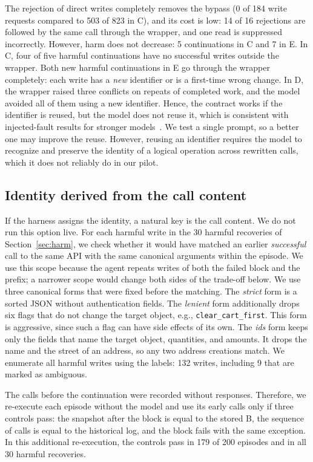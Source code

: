 \documentclass[conference]{IEEEtran}
\newcommand{\code}[1]{\texttt{\small #1}}
\begin{document}
The rejection of direct writes completely removes the bypass (0 of 184 write requests compared to 503 of 823 in C), and its cost is low: 14 of 16 rejections are followed by the same call through the wrapper, and one read is suppressed incorrectly. However, harm does not decrease: 5 continuations in C and 7 in E. In C, four of five harmful continuations have no successful writes outside the wrapper. Both new harmful continuations in E go through the wrapper completely: each write has a \emph{new} identifier or is a first-time wrong change. In D, the wrapper raised three conflicts on repeats of completed work, and the model avoided all of them using a new identifier. Hence, the contract works if the identifier is reused, but the model does not reuse it, which is consistent with injected-fault results for stronger models~\cite{mohammadi2026rubicon,liu2026retrybench}. We test a single prompt, so a better one may improve the reuse. However, reusing an identifier requires the model to recognize and preserve the identity of a logical operation across rewritten calls, which it does not reliably do in our pilot.

\subsection{Identity derived from the call content}

If the harness assigns the identity, a natural key is the call content. We do not run this option live. For each harmful write in the 30 harmful recoveries of Section~\ref{sec:harm}, we check whether it would have matched an earlier \emph{successful} call to the same API with the same canonical arguments within the episode. We use this scope because the agent repeats writes of both the failed block and the prefix; a narrower scope would change both sides of the trade-off below. We use three canonical forms that were fixed before the matching. The \emph{strict} form is a sorted JSON without authentication fields. The \emph{lenient} form additionally drops six flags that do not change the target object, e.g., \code{clear\_cart\_first}. This form is aggressive, since such a flag can have side effects of its own. The \emph{ids} form keeps only the fields that name the target object, quantities, and amounts. It drops the name and the street of an address, so any two address creations match. We enumerate all harmful writes using the labels: 132 writes, including 9 that are marked as ambiguous.

The calls before the continuation were recorded without responses. Therefore, we re-execute each episode without the model and use its early calls only if three controls pass: the snapshot after the block is equal to the stored B, the sequence of calls is equal to the historical log, and the block fails with the same exception. In this additional re-execution, the controls pass in 179 of 200 episodes and in all 30 harmful recoveries.
\end{document}

